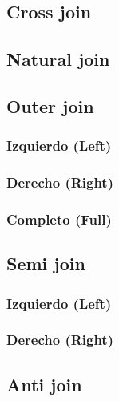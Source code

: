 \documentclass{article}
\begin{document}
\begin{multicols}{2}
		\subsection{Cross join}
		
		\subsection{Natural join}
		
		\subsection{Outer join}
		
		\subsubsection{Izquierdo (Left)}
		\subsubsection{Derecho (Right)}
		\subsubsection{Completo (Full)}
		
		\subsection{Semi join}
		
		\subsubsection{Izquierdo (Left)}
		\subsubsection{Derecho (Right)}
		
		\subsection{Anti join}
	
	\end{multicols}
	
\end{document}
